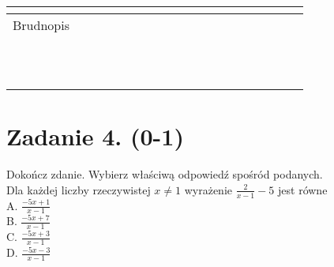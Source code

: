 \documentclass[10pt]{article}
\begin{document}
\begin{center}
\begin{tabular}{|c|c|c|c|c|c|c|c|c|c|c|c|c|c|c|c|c|c|c|c|c|c|}
\hline
\multicolumn{5}{|l|}{} &  &  &  &  &  &  &  &  &  &  &  &  &  &  &  &  &  \\
\hline
\multicolumn{4}{|l|}{Brudnopis} &  &  &  &  &  &  &  &  &  &  &  &  &  &  &  &  &  &  \\
\hline
 &  &  &  &  &  &  &  &  &  &  &  &  &  &  &  &  &  &  &  &  &  \\
\hline
 &  &  &  &  &  &  &  &  &  &  &  &  &  &  &  &  &  &  &  &  &  \\
\hline
 &  &  &  &  &  &  &  &  &  &  &  &  &  &  &  &  &  &  &  &  &  \\
\hline
 &  &  &  &  &  &  &  &  &  &  &  &  &  &  &  &  &  &  &  &  &  \\
\hline
 &  &  &  &  &  &  &  &  &  &  &  &  &  &  &  &  &  &  &  &  &  \\
\hline
 &  &  &  &  &  &  &  &  &  &  &  &  &  &  &  &  &  &  &  &  &  \\
\hline
 &  &  &  &  &  &  &  &  &  &  &  &  &  &  &  &  &  &  &  &  &  \\
\hline
 &  &  &  &  &  &  &  &  &  &  &  &  &  &  &  &  &  &  &  &  &  \\
\hline
 &  &  &  &  &  &  &  &  &  &  &  &  &  &  &  &  &  &  &  &  &  \\
\hline
 &  &  &  &  &  &  &  &  &  &  &  &  &  &  &  &  &  &  &  &  &  \\
\hline
 &  &  &  &  &  &  &  &  &  &  &  &  &  &  &  &  &  &  &  &  &  \\
\hline
\end{tabular}
\end{center}

\section*{Zadanie 4. (0-1)}
Dokończ zdanie. Wybierz właściwą odpowiedź spośród podanych.\\
Dla każdej liczby rzeczywistej \(x \neq 1\) wyrażenie \(\frac{2}{x-1}-5\) jest równe\\
A. \(\frac{-5 x+1}{x-1}\)\\
B. \(\frac{-5 x+7}{x-1}\)\\
C. \(\frac{-5 x+3}{x-1}\)\\
D. \(\frac{-5 x-3}{x-1}\)
\end{document}
